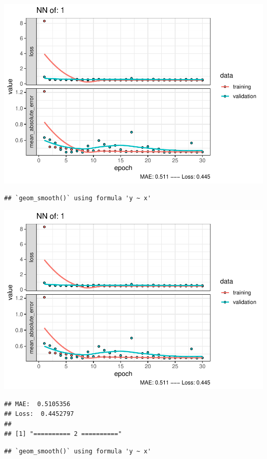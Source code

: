 \documentclass[
]{article}
\begin{document}
\includegraphics{project-code_files/figure-latex/unnamed-chunk-18-1.pdf}

\begin{verbatim}
## `geom_smooth()` using formula 'y ~ x'
\end{verbatim}

\includegraphics{project-code_files/figure-latex/unnamed-chunk-18-2.pdf}

\begin{verbatim}
## MAE:  0.5105356
## Loss:  0.4452797 
## 
## [1] "========== 2 =========="
\end{verbatim}

\begin{verbatim}
## `geom_smooth()` using formula 'y ~ x'
\end{verbatim}
\end{document}
